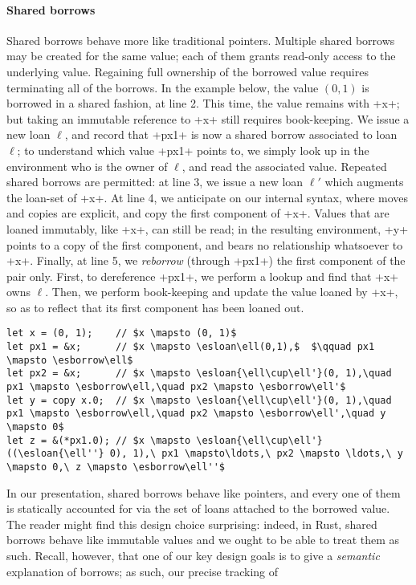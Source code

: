 \documentclass[acmsmall,screen]{acmart}
\newif\iflong
\newcommand\esborrow[1]{\ensuremath{\mathsf{borrow}^s\,#1}}
\newcommand\esloan[2]{\ensuremath{\mathsf{loan}^s\,\{#1\}\,#2}}
\newcommand\myparagraph[1]{\emph{#1}.\ }
\let\myparagraph\paragraph
\begin{document}
\myparagraph{Shared borrows}
Shared borrows behave more like traditional pointers. Multiple shared borrows
may be created for the same value; each of them grants read-only access to the
underlying value. Regaining full ownership of the borrowed value requires
terminating all of the borrows. In the example
below, the value $(0, 1)$ is borrowed in a shared fashion, at line 2. This time,
the value remains with \li+x+; but taking an immutable reference to
\li+x+ still requires book-keeping. We issue a new loan $\ell$, and record that
\li+px1+ is now a shared borrow associated to loan $\ell$; to understand which
value \li+px1+ points to, we simply look up in the environment who is the owner
of $\ell$, and read the associated value.
Repeated shared borrows are permitted: at line 3, we issue a new loan $\ell'$
which augments the loan-set of \li+x+.
At line 4, we anticipate on our internal syntax, where moves and copies are
explicit, and copy the first component of \li+x+. Values that are loaned
immutably, like \li+x+, can still be read; in the resulting environment, \li+y+ points to a copy of
the first component, and bears no relationship whatsoever to \li+x+.
Finally, at line 5, we \emph{reborrow} (through \li+px1+) the first component of
the pair only. First, to dereference \li+px1+, we perform a lookup and find that
\li+x+ owns $\ell$. Then, we perform book-keeping and update the value loaned by
\li+x+, so as to reflect that its first component has been loaned
out.
\begin{verbatim}
let x = (0, 1);    // $x \mapsto (0, 1)$
let px1 = &x;      // $x \mapsto \esloan\ell(0,1),$  $\qquad px1 \mapsto \esborrow\ell$
let px2 = &x;      // $x \mapsto \esloan{\ell\cup\ell'}(0, 1),\quad px1 \mapsto \esborrow\ell,\quad px2 \mapsto \esborrow\ell'$
let y = copy x.0;  // $x \mapsto \esloan{\ell\cup\ell'}(0, 1),\quad px1 \mapsto \esborrow\ell,\quad px2 \mapsto \esborrow\ell',\quad y \mapsto 0$
let z = &(*px1.0); // $x \mapsto \esloan{\ell\cup\ell'}((\esloan{\ell''} 0), 1),\ px1 \mapsto\ldots,\ px2 \mapsto \ldots,\ y \mapsto 0,\ z \mapsto \esborrow\ell''$
\end{verbatim}
\iflong
In our presentation, shared borrows behave like pointers, and every one of them
is statically accounted for via the set of loans attached to the borrowed value.
The reader might find this design choice surprising: indeed, in Rust, shared
borrows behave like immutable values and we ought to be able to treat them as
such. Recall, however, that one of our key design goals is to give a
\emph{semantic} explanation of borrows; as such, our precise tracking of
\end{document}
